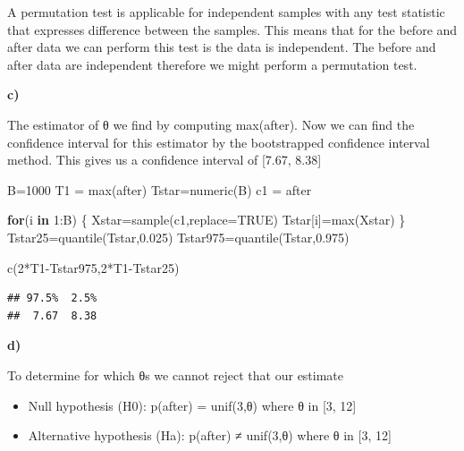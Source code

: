 \documentclass[
]{article}
\newenvironment{Shaded}{\begin{snugshade}}{\end{snugshade}}
\newcommand{\AttributeTok}[1]{\textcolor[rgb]{0.77,0.63,0.00}{#1}}
\newcommand{\ConstantTok}[1]{\textcolor[rgb]{0.00,0.00,0.00}{#1}}
\newcommand{\ControlFlowTok}[1]{\textcolor[rgb]{0.13,0.29,0.53}{\textbf{#1}}}
\newcommand{\DecValTok}[1]{\textcolor[rgb]{0.00,0.00,0.81}{#1}}
\newcommand{\FloatTok}[1]{\textcolor[rgb]{0.00,0.00,0.81}{#1}}
\newcommand{\FunctionTok}[1]{\textcolor[rgb]{0.00,0.00,0.00}{#1}}
\newcommand{\NormalTok}[1]{#1}
\newcommand{\OtherTok}[1]{\textcolor[rgb]{0.56,0.35,0.01}{#1}}
\newcommand{\SpecialCharTok}[1]{\textcolor[rgb]{0.00,0.00,0.00}{#1}}
\begin{document}
A permutation test is applicable for independent samples with any test
statistic that expresses difference between the samples. This means that
for the before and after data we can perform this test is the data is
independent. The before and after data are independent therefore we
might perform a permutation test.

\textbf{c)}

The estimator of θ we find by computing max(after). Now we can find the
confidence interval for this estimator by the bootstrapped confidence
interval method. This gives us a confidence interval of {[}7.67, 8.38{]}

\begin{Shaded}
\begin{Highlighting}[]
\NormalTok{B}\OtherTok{=}\DecValTok{1000}
\NormalTok{T1 }\OtherTok{=} \FunctionTok{max}\NormalTok{(after)}
\NormalTok{Tstar}\OtherTok{=}\FunctionTok{numeric}\NormalTok{(B)}
\NormalTok{c1 }\OtherTok{=}\NormalTok{ after}

\ControlFlowTok{for}\NormalTok{(i }\ControlFlowTok{in} \DecValTok{1}\SpecialCharTok{:}\NormalTok{B) \{}
\NormalTok{  Xstar}\OtherTok{=}\FunctionTok{sample}\NormalTok{(c1,}\AttributeTok{replace=}\ConstantTok{TRUE}\NormalTok{)}
\NormalTok{  Tstar[i]}\OtherTok{=}\FunctionTok{max}\NormalTok{(Xstar)}
\NormalTok{\}}
\NormalTok{Tstar25}\OtherTok{=}\FunctionTok{quantile}\NormalTok{(Tstar,}\FloatTok{0.025}\NormalTok{)}
\NormalTok{Tstar975}\OtherTok{=}\FunctionTok{quantile}\NormalTok{(Tstar,}\FloatTok{0.975}\NormalTok{)}

\FunctionTok{c}\NormalTok{(}\DecValTok{2}\SpecialCharTok{*}\NormalTok{T1}\SpecialCharTok{{-}}\NormalTok{Tstar975,}\DecValTok{2}\SpecialCharTok{*}\NormalTok{T1}\SpecialCharTok{{-}}\NormalTok{Tstar25)}
\end{Highlighting}
\end{Shaded}

\begin{verbatim}
## 97.5%  2.5% 
##  7.67  8.38
\end{verbatim}

\textbf{d)}

To determine for which θs we cannot reject that our estimate

\begin{itemize}
\item
  Null hypothesis (H0): p(after) = unif(3,θ) where θ in {[}3, 12{]}
\item
  Alternative hypothesis (Ha): p(after) ≠ unif(3,θ) where θ in {[}3,
  12{]}
\end{itemize}
\end{document}
